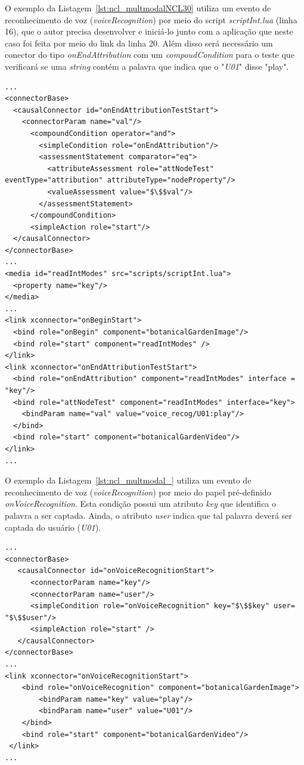 O exemplo da Listagem~\ref{lst:ncl_multmodalNCL30} utiliza um evento de reconhecimento de voz (\textit{voiceRecognition}) por meio do script \textit{scriptInt.lua} (linha 16), que o autor precisa desenvolver e iniciá-lo junto com a aplicação que neste caso foi feita por meio do link da linha 20. Além disso será necessário um conector do tipo \textit{onEndAttribution} com um \textit{compoudCondition} para o teste que verificará se uma \textit{string} contém a palavra que indica que o "\textit{U01}" disse "play".

\begin{lstlisting}[language=ncl,label=lst:ncl_multmodalNCL30, caption={Conector e elo para interação mutimodal em NCL 3.0}]
...
<connectorBase>
  <causalConnector id="onEndAttributionTestStart">    	
    <connectorParam name="val"/>
      <compoundCondition operator="and">
        <simpleCondition role="onEndAttribution"/>       	
	    <assessmentStatement comparator="eq">
	      <attributeAssessment role="attNodeTest" eventType="attribution" attributeType="nodeProperty"/>
	      <valueAssessment value="$\$$val"/>
	    </assessmentStatement>
	  </compoundCondition>
   	  <simpleAction role="start"/>
  </causalConnector>
</connectorBase>
...
<media id="readIntModes" src="scripts/scriptInt.lua">
  <property name="key"/> 
</media>
...
<link xconnector="onBeginStart">
  <bind role="onBegin" component="botanicalGardenImage"/>
  <bind role="start" component="readIntModes" />
</link>
<link xconnector="onEndAttributionTestStart">
  <bind role="onEndAttribution" component="readIntModes" interface = "key"/>
  <bind role="attNodeTest" component="readIntModes" interface="key">
	<bindParam name="val" value="voice_recog/U01:play"/>
  </bind>	
  <bind role="start" component="botanicalGardenVideo"/>
</link>
...
\end{lstlisting}

O exemplo da Listagem~\ref{lst:ncl_multmodal_} utiliza um evento de reconhecimento de voz (\textit{voiceRecognition}) por meio do papel pré-definido \textit{onVoiceRecognition}. Esta condição possui um atributo \textit{key} que identifica o palavra a ser captada. Ainda, o atributo \textit{user} indica que tal palavra deverá ser captada do usuário (\textit{U01}).

\begin{lstlisting}[language=ncl,label=lst:ncl_multmodal_, caption={Conector e elo para interação mutimodal em NCL estendido}]
...
<connectorBase>
   <causalConnector id="onVoiceRecognitionStart">
      <connectorParam name="key"/>
      <connectorParam name="user"/>      
      <simpleCondition role="onVoiceRecognition" key="$\$$key" user= "$\$$user"/>
      <simpleAction role="start" />
   </causalConnector>  
</connectorBase>
...
<link xconnector="onVoiceRecognitionStart">
 	<bind role="onVoiceRecognition" component="botanicalGardenImage">
  		<bindParam name="key" value="play"/>
   		<bindParam name="user" value="U01"/>
 	</bind>
 	<bind role="start" component="botanicalGardenVideo"/>
 </link> 
...
\end{lstlisting}


